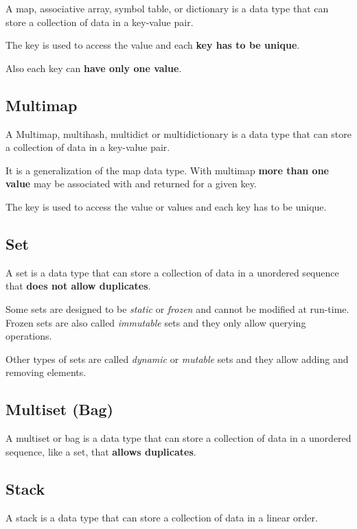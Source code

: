 \documentclass{book}
\begin{document}
A map, associative array, symbol table, or dictionary is a data type that can store a collection of data in a key-value pair.

\noindent The key is used to access the value and each \textbf{key has to be unique}.

\noindent Also each key can \textbf{have only one value}.

\subsection{Multimap}

A Multimap, multihash, multidict or multidictionary is a data type that can store a collection of data in a key-value pair.

\noindent It is a generalization of the map data type. With multimap \textbf{more than one value} may be associated with and returned for a given key.

\noindent The key is used to access the value or values and each key has to be unique.

\subsection{Set}

A set is a data type that can store a collection of data in a unordered sequence that \textbf{does not allow duplicates}.

\noindent Some sets are designed to be \textit{static} or \textit{frozen} and cannot be modified at run-time. Frozen sets are also called \textit{immutable} sets and they only allow querying operations.

\noindent Other types of sets are called \textit{dynamic} or \textit{mutable} sets and they allow adding and removing elements.

\subsection{Multiset (Bag)}

    A multiset or bag is a data type that can store a collection of data in a unordered sequence, like a set, that \textbf{allows duplicates}.

\subsection{Stack}

    A stack is a data type that can store a collection of data in a linear order.
\end{document}

